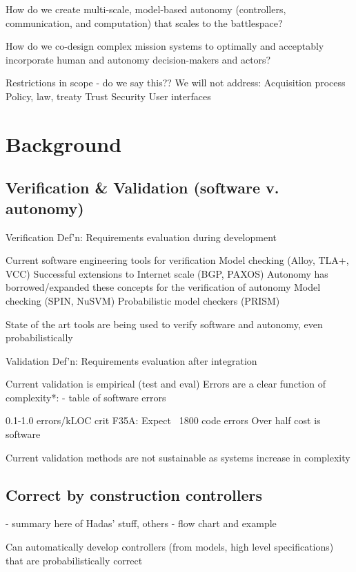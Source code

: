 \documentclass[11pt]{dssg}
\begin{document}
How do we create multi-scale, model-based autonomy (controllers, communication, and computation) that scales to the battlespace?

How do we co-design complex mission systems to optimally and acceptably incorporate human and autonomy decision-makers and actors?




Restrictions in scope - do we say this?? We will not address:
Acquisition process
Policy, law, treaty
Trust
Security
User interfaces


\section*{Background}

\subsection*{Verification \& Validation (software v. autonomy)}
Verification Def’n: Requirements evaluation during development

Current software engineering tools for verification
Model checking (Alloy, TLA+, VCC)
Successful extensions to Internet scale (BGP, PAXOS)
Autonomy has borrowed/expanded these concepts for the verification of autonomy
Model checking (SPIN, NuSVM)
Probabilistic model checkers (PRISM)

State of the art tools are being used to verify software and autonomy, even probabilistically 

Validation Def’n: Requirements evaluation after integration

Current validation is empirical (test and eval)
Errors are a clear function of complexity*: 
- table of software errors

0.1-1.0 errors/kLOC crit
F35A:
Expect ~1800 code errors
Over half cost is software

Current validation methods are not sustainable as systems increase in complexity





\subsection*{Correct by construction controllers}

- summary here of Hadas’ stuff, others
- flow chart and example



Can automatically develop  controllers (from models, high level specifications) that are probabilistically correct
\end{document}
